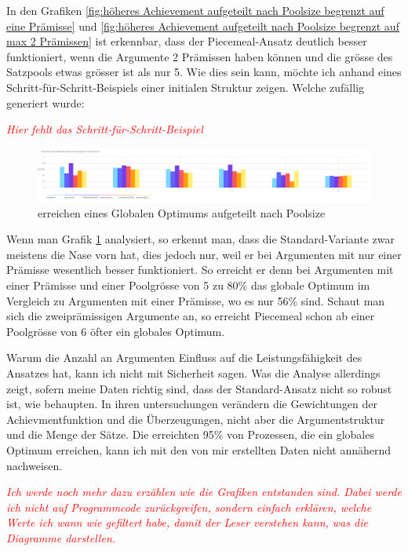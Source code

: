 \documentclass{article}
\begin{document}
In den Grafiken \ref{fig:höheres Achievement aufgeteilt nach Poolsize begrenzt auf eine Prämisse} und \ref{fig:höheres Achievement aufgeteilt nach Poolsize begrenzt auf max 2 Prämissen} ist erkennbar, dass der Piecemeal-Ansatz deutlich besser funktioniert, wenn die Argumente 2 Prämissen haben können und die grösse des Satzpools etwas grösser ist als nur 5. Wie dies sein kann, möchte ich anhand eines Schritt-für-Schritt-Beispiels einer initialen Struktur zeigen. Welche zufällig generiert wurde:

\textit{\textcolor{red}{Hier fehlt das Schritt-für-Schritt-Beispiel}}

\begin{figure}[ht]
  \centering
  \includegraphics[width=\textwidth]{erreichen eines Globalen Optimums aufgeteilt nach Poolsize}
  \caption{erreichen eines Globalen Optimums aufgeteilt nach Poolsize\label{fig:GlobOptPoolsize}}
\end{figure}


Wenn man Grafik \ref{fig:GlobOptPoolsize} analysiert, so erkennt man, dass die Standard-Variante zwar meistens die Nase vorn hat, dies jedoch nur, weil er bei Argumenten mit nur einer Prämisse wesentlich besser funktioniert. So erreicht er denn bei Argumenten mit einer Prämisse und einer Poolgrösse von 5 zu 80\% das globale Optimum im Vergleich zu Argumenten mit einer Prämisse, wo es nur 56\% sind. Schaut man sich die zweiprämissigen Argumente an, so erreicht Piecemeal schon ab einer Poolgrösse von 6 öfter ein globales Optimum.

Warum die Anzahl an Argumenten Einfluss auf die Leistungsfähigkeit des Ansatzes hat, kann ich nicht mit Sicherheit sagen. Was die Analyse allerdings zeigt, sofern meine Daten richtig sind, dass der Standard-Ansatz nicht so robust ist, wie \autocite[S.~17-18]{beisbart_making_2015} behaupten. In ihren untersuchungen verändern \citeauthor{beisbart_making_2015} die Gewichtungen der Achievmentfunktion und die Überzeugungen, nicht aber die Argumentstruktur und die Menge der Sätze. Die erreichten 95\% von Prozessen, die ein globales Optimum erreichen, kann ich mit den von mir erstellten Daten nicht annähernd nachweisen.

\textit{\textcolor{red}{Ich werde noch mehr dazu erzählen wie die Grafiken entstanden sind. Dabei werde ich nicht auf Programmcode zurückgreifen, sondern einfach erklären, welche Werte ich wann wie gefiltert habe, damit der Leser verstehen kann, was die Diagramme darstellen.}}
\end{document}
